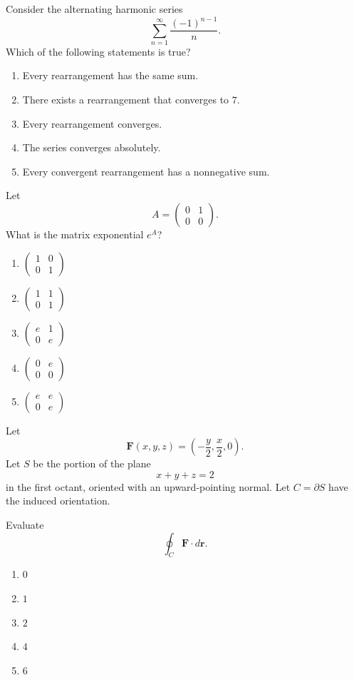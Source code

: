 \begin{exercise}
Consider the alternating harmonic series
\[
\sum_{n=1}^{\infty}\frac{(-1)^{n-1}}n.
\]
Which of the following statements is true?
\begin{enumerate}[label=(\Alph*)]
\item Every rearrangement has the same sum.
\item There exists a rearrangement
that converges to $7$.
\item Every rearrangement converges.
\item The series converges absolutely.
\item Every convergent rearrangement
has a nonnegative sum.
\end{enumerate}
\end{exercise}

\begin{exercise}
Let
\[
A=\begin{pmatrix}0&1\\0&0\end{pmatrix}.
\]
What is the matrix exponential $e^A$?
\begin{enumerate}[label=(\Alph*)]
\item $\begin{pmatrix}1&0\\0&1\end{pmatrix}$
\item $\begin{pmatrix}1&1\\0&1\end{pmatrix}$
\item $\begin{pmatrix}e&1\\0&e\end{pmatrix}$
\item $\begin{pmatrix}0&e\\0&0\end{pmatrix}$
\item $\begin{pmatrix}e&e\\0&e\end{pmatrix}$
\end{enumerate}
\end{exercise}

\begin{exercise}
Let
\[
\mathbf F(x,y,z)=
\left(-\frac y2,\frac x2,0\right).
\]
Let $S$ be the portion of the plane
\[
x+y+z=2
\]
in the first octant, oriented with an
upward-pointing normal. Let $C=\partial S$
have the induced orientation.

Evaluate
\[
\oint_C\mathbf F\cdot d\mathbf r.
\]
\begin{enumerate}[label=(\Alph*)]
\item $0$
\item $1$
\item $2$
\item $4$
\item $6$
\end{enumerate}
\end{exercise}


